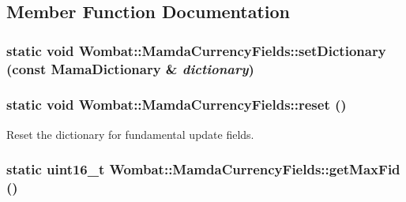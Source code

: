 \subsection{Member Function Documentation}
\hypertarget{classWombat_1_1MamdaCurrencyFields_b8f7dae141b38d0f2fb8559cbdc5d2ac}{
\subsubsection[setDictionary]{\setlength{\rightskip}{0pt plus 5cm}static void Wombat::Mamda\-Currency\-Fields::set\-Dictionary (const Mama\-Dictionary \& {\em dictionary})}}
\label{classWombat_1_1MamdaCurrencyFields_b8f7dae141b38d0f2fb8559cbdc5d2ac}


\hypertarget{classWombat_1_1MamdaCurrencyFields_ef59780f0045349e99e8a8edf2f2806c}{
\subsubsection[reset]{\setlength{\rightskip}{0pt plus 5cm}static void Wombat::Mamda\-Currency\-Fields::reset ()}}
\label{classWombat_1_1MamdaCurrencyFields_ef59780f0045349e99e8a8edf2f2806c}


Reset the dictionary for fundamental update fields. 

\hypertarget{classWombat_1_1MamdaCurrencyFields_777ea2ca34e62297186846eaf8b53da2}{
\subsubsection[getMaxFid]{\setlength{\rightskip}{0pt plus 5cm}static uint16\_\-t Wombat::Mamda\-Currency\-Fields::get\-Max\-Fid ()}}
\label{classWombat_1_1MamdaCurrencyFields_777ea2ca34e62297186846eaf8b53da2}


